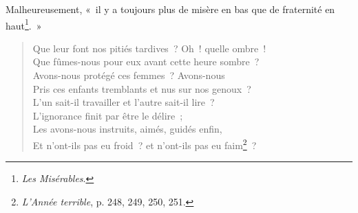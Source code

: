 \documentclass[french,twoside]{book} %
\begin{document}
\noindent Malheureusement, « il y a toujours plus de misère en bas que de fraternité en haut\footnote{\emph{Les Misérables}.}. »\par


\begin{verse}
Que leur font nos pitiés tardives ? Oh ! quelle ombre !\\
Que fûmes-nous pour eux avant cette heure sombre ?\\
Avons-nous protégé ces femmes ? Avons-nous\\
Pris ces enfants tremblants et nus sur nos genoux ?\\
L’un sait-il travailler et l’autre sait-il lire ?\\
L’ignorance finit par être le délire ;\\
Les avons-nous instruits, aimés, guidés enfin,\\
Et n’ont-ils pas eu froid ? et n’ont-ils pas eu faim\footnote{\emph{L’Année terrible}, p. 248, 249, 250, 251.} ?\\
\end{verse}
\end{document}
